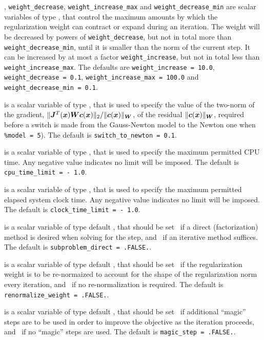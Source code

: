 \documentclass{galahad}
\begin{document}
\begin{description}
,
{\tt weight\_decrease},
{\tt weight\_increase\_max}
and
{\tt weight\_decrease\_min}
are scalar variables of type \realdp, that
control the maximum amounts by which the regularization weight can
contract or expand during an iteration. The weight will be decreased by
powers of {\tt weight\_decrease}, but not in total
more than  {\tt weight\_decrease\_min}, until it is smaller than the norm of
the current step.
It can be increased by at most a factor {\tt weight\_increase}, but not
in total less than {\tt weight\_increase\_max}.
The defaults are
{\tt weight\_increase = 10.0},
{\tt weight\_decrease = 0.1},
{\tt weight\_incr\-ease\_max = 100.0} and
{\tt weight\_decrease\_min = 0.1}.

 is a scalar variable of type \realdp,
that is used to specify the value of the two-norm of the gradient,
 $\|{\bm{J}}^T({\bm{x}}) {\bm{W}} {\bm{c}}({\bm{x}})\|_2/\|{\bm{c}}({\bm{x}})\|_{{\bm{W}}}$,
of the residual  $\|{\bm{c}}({\bm{x}})\|_{{\bm{W}}}$, required before a switch is made
from the Gauss-Newton model to the Newton one when {\tt \%model = 5}).
The default is
{\tt switch\_to\_newton = 0.1}.

 is a scalar variable of type \realdp,
that is used to specify the maximum permitted CPU time. Any negative
value indicates no limit will be imposed. The default is
{\tt cpu\_time\_limit = - 1.0}.

 is a scalar variable of type \realdp,
that is used to specify the maximum permitted elapsed system clock time.
Any negative value indicates no limit will be imposed. The default is
{\tt clock\_time\_limit = - 1.0}.

is a scalar variable of type default \logical,
that should be set \true\ if a direct (factorization) method is
desired when solving for the step, and \false\ if an iterative
method suffices.
The default is {\tt subproblem\_direct = .FALSE.}.

is a scalar variable of type default \logical,
that should be set \true\ if the regularization weight is to be
re-normaized to account for the shape of the regularization norm
every iteration, and \false\ if no re-normalization is required.
The default is {\tt renormalize\_weight = .FALSE.}.

is a scalar variable of type default \logical,
that should be set \true\ if additional ``magic'' steps are to be
used in order to improve the objective as the iteration proceeds,
and \false\ if no ``magic'' steps are used.
The default is {\tt magic\_step = .FALSE.}.


\end{description}
\end{document}
